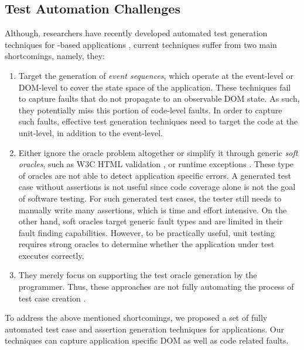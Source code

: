 \subsection{Test Automation Challenges}
Although, researchers have recently developed automated test generation techniques for \javascript-based applications \cite{artzi:icse11, marchetto:search, tonella:icst08, mesbah:tse12, song:symb10}, current techniques suffer from two main shortcomings, namely, they:
\begin{enumerate} 
\item Target the generation of \emph{event sequences}, which operate at the event-level or DOM-level to cover the state space of the application. These techniques fail to capture faults that  do not propagate to an observable DOM state. As such, they potentially miss this portion of code-level \javascript faults. In order to capture such faults, effective test generation techniques need to target the code at the \javascript unit-level, in addition to the event-level.
\item Either ignore the oracle problem altogether or simplify it through generic \emph{soft oracles}, such as  W3C HTML  validation \cite{artzi:icse11,mesbah:tse12}, or  \javascript runtime exceptions \cite{artzi:icse11}. These type of oracles are not able to detect application specific errors.
A generated test case without assertions is not useful since code coverage alone is not the goal of software testing. For such generated test cases, the tester still needs to  manually write many assertions, which is time and effort intensive. 
On the other hand, soft oracles  target generic fault types and are limited in their fault finding capabilities.   %
However, to be practically useful, unit testing requires strong oracles to determine whether the application under test executes correctly.
\item They merely focus on supporting the test oracle generation by the programmer. Thus, these approaches are not fully automating the process of test case creation \cite{staats:icse12,loyola:issta14}.
\end{enumerate}
To address the above mentioned shortcomings, we proposed a set of fully automated test case and assertion generation techniques for \javascript applications. Our techniques can capture application specific DOM as well as \javascript code related faults.

